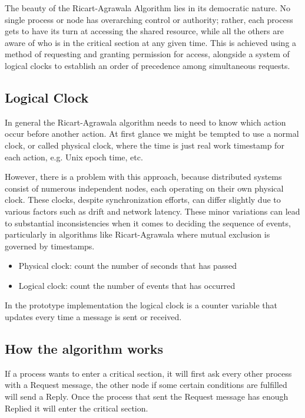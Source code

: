The beauty of the Ricart-Agrawala Algorithm lies in its democratic nature. No 
single process or node has overarching control or authority; rather, each process 
gets to have its turn at accessing the shared resource, while all the others are 
aware of who is in the critical section at any given time. This is achieved using 
a method of requesting and granting permission for access, alongside a system of 
logical clocks to establish an order of precedence among simultaneous requests.

\subsection{Logical Clock}
In general the Ricart-Agrawala algorithm needs to need to know which action occur 
before another action. At first glance we might be tempted to use a normal clock, 
or called physical clock, where the time is just real work timestamp for each action, 
e.g. Unix epoch time, etc.

However, there is a problem with this approach, because 
distributed systems consist of numerous independent nodes, each operating on their 
own physical clock. These clocks, despite synchronization efforts, can differ 
slightly due to various factors such as drift and network latency. These minor 
variations can lead to substantial inconsistencies when it comes to deciding the 
sequence of events, particularly in algorithms like Ricart-Agrawala where mutual 
exclusion is governed by timestamps.


\begin{itemize}
  \item Physical clock: count the number of seconds that has passed
  \item Logical clock: count the number of events that has occurred
\end{itemize}

In the prototype implementation the logical clock is a counter variable that updates
every time a message is sent or received.
\subsection{How the algorithm works}
If a process wants to enter a critical section, it will first ask every other 
process with a Request message, the other node if some certain conditions are fulfilled
will send a Reply. Once the process that sent the Request message has enough Replied
it will enter the critical section.

